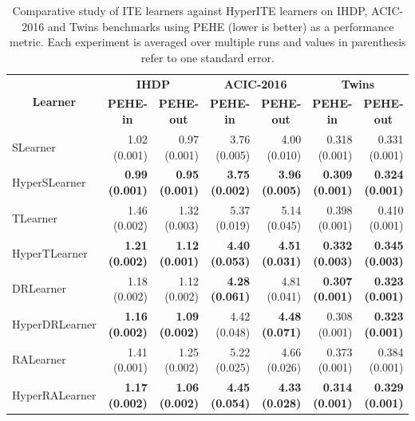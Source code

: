 \documentclass{article}
\begin{document}
\begin{table}[htb!]
	\small
	\centering
	\caption{Comparative study of ITE learners against HyperITE learners on IHDP, ACIC-2016 and Twins benchmarks using PEHE (lower is better) as a performance metric. Each experiment is averaged over multiple runs and values in parenthesis refer to one standard error.}
	\label{tab_results}
	\begin{tabular}{lrrrrrr}\\ \hline
		\multicolumn{1}{c}{\multirow{2}{*}{\textbf{Learner}}} &
		\multicolumn{2}{c}{\textbf{IHDP}} &
		\multicolumn{2}{c}{\textbf{ACIC-2016}} &
		\multicolumn{2}{c}{\textbf{Twins}} \\
		\multicolumn{1}{c}{} &
		\multicolumn{1}{c}{\textbf{PEHE-in}} &
		\multicolumn{1}{c}{\textbf{PEHE-out}} &
		\multicolumn{1}{c}{\textbf{PEHE-in}} &
		\multicolumn{1}{c}{\textbf{PEHE-out}} &
		\multicolumn{1}{c}{\textbf{PEHE-in}} &
		\multicolumn{1}{c}{\textbf{PEHE-out}} \\ \hline
		SLearner       & 1.02 (0.001) & 0.97 (0.001) &  3.76 (0.005) & 4.00 (0.010) & 0.318	(0.001) &	0.331	(0.001)\\
		HyperSLearner  & \textbf{0.99 (0.001)} & \textbf{0.95 (0.001)} &  \textbf{3.75 (0.002)} & \textbf{3.96 (0.005)} & \textbf{0.309	(0.001)} &	\textbf{0.324	(0.001)}\\ \hline
		TLearner       & 1.46 (0.002) & 1.32 (0.003) &  5.37 (0.019) &	5.14	(0.045) & 0.398	(0.001) &	0.410	(0.001) \\
		HyperTLearner  & \textbf{1.21 (0.002)} & \textbf{1.12 (0.001)} &  \textbf{4.40 (0.053)} & \textbf{4.51 (0.031)} & \textbf{0.332	(0.003)}	& \textbf{0.345	(0.003)} \\ \hline
		DRLearner      & 1.18 (0.002) & 1.12 (0.002) & \textbf{4.28 (0.061)} & 4.81 (0.041) & \textbf{0.307 (0.001)} &	\textbf{0.323 (0.001)}\\
		HyperDRLearner & \textbf{1.16 (0.002)} & \textbf{1.09 (0.002)} & 4.42 (0.048) & \textbf{4.48 (0.071)} & 0.308	(0.001) &	\textbf{0.323	(0.001)}\\ \hline
		RALearner      & 1.41 (0.001) & 1.25 (0.002) &  5.22 (0.025) & 4.66 (0.026) & 0.373	(0.001)	& 0.384	(0.001) \\
		HyperRALearner & \textbf{1.17 (0.002)} & \textbf{1.06 (0.002)} &  \textbf{4.45 (0.054)} & \textbf{4.33 (0.028)} & \textbf{0.314	(0.001)}	& \textbf{0.329	(0.001)} \\ \hline

\end{tabular}
\end{table}
\end{document}
